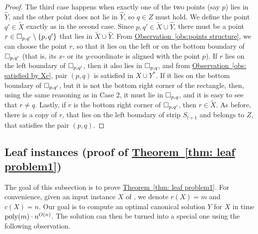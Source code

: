 \documentclass[11pt]{article}
\numberwithin{equation}{section}
\theoremstyle{definition}
\theoremstyle{plain}
\newcommand{\expref}[2]{\hyperref[#2]{#1~\ref{#2}}}
\begin{document}
\begin{proof}
The third case happens when exactly one of the two points (say $p$) lies in $\hat Y$, and the other point does not lie in $\hat Y$, so $q\in Z$ must hold. We define  the point $q'\in \widetilde{X}$ exactly as in the second case. Since $p,q'\in \widetilde{X}\cup \hat Y$, there must be a point $r\in \Box_{p,q'}\setminus\left\{ p,q' \right\}$ that lies in $\widetilde{X}\cup \hat Y$. From \expref{Observation}{obs:points structure}, we can choose the point $r$, so that it lies on the left or on the bottom boundary of $\Box_{p,q'}$ (that is, its $x$- or its $y$-coordinate is aligned with the point $p$). If $r$ lies on the left boundary of $\Box_{p,q'}$, then it also lies in $\Box_{p,q}$, and from \expref{Observation}{obs: satisfied by Xc}, pair $(p,q)$ is satisfied in $X\cup Y^*$. If it lies on the bottom boundary of $\Box_{p,q'}$, but it is not the bottom right corner of the rectangle, then, using the same reasoning as in Case 2, it must lie in $\Box_{p,q}$, and it is easy to see that $r\neq q$. Lastly, if $r$ is the bottom right corner of $\Box_{p,q'}$, then $r\in \widetilde{X}$. As before, there is a copy of $r$, that lies on the left boundary of strip $S_{l+1}$ and belongs to $Z$, that satisfies the pair $(p,q)$. 
\end{proof}

\subsection{Leaf instances (proof of \expref{Theorem}{thm: leaf problem1})}
\label{sec: leaf problem}


The goal of this subsection is to prove \expref{Theorem}{thm: leaf problem1}. For convenience, given an input instance $X$ of \minsat, we denote $r(X)=m$ and $c(X)=n$. Our goal is to compute an optimal canonical solution $Y$ for $X$ in time $\operatorname{poly}(m)\cdot n^{O(n)}$. The solution can then be turned into a special one using the following observation. 
\end{document}
